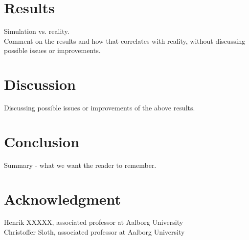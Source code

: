 \section{Results}
Simulation vs. reality. \\
Comment on the results and how that correlates with reality, without discussing possible issues or improvements.

\section{Discussion}
Discussing possible issues or improvements of the above results.

\section{Conclusion}
Summary - what we want the reader to remember.
\section*{Acknowledgment}
Henrik XXXXX, associated professor at Aalborg University \\
Christoffer Sloth, associated professor at Aalborg University



%
\printbibliography
%
%




